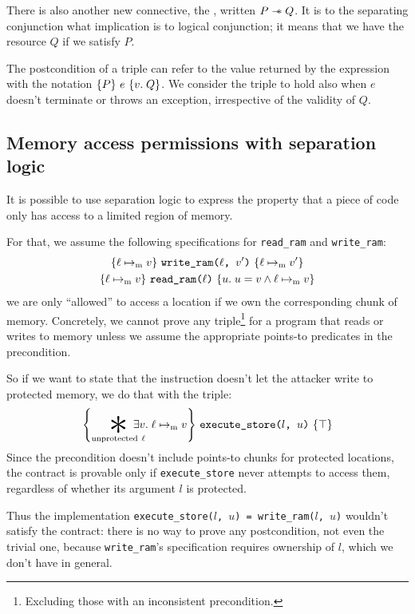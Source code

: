 There is also another new connective, the , written \(P \mathrel{-\!\!\ast} Q\). It is to the separating conjunction what implication is to logical conjunction; it means that we have the resource \(Q\) if we satisfy \(P\).

The postcondition of a triple can refer to the value returned by the expression with the notation \(\hoare{P}{e}[v]{Q}\). We consider the triple to hold also when \(e\) doesn't terminate or throws an exception, irrespective of the validity of \(Q\).

\subsection{Memory access permissions with separation logic}
\label{sec:sep-logic-permissions}

It is possible to use separation logic to express the property that a piece of code only has access to a limited region of memory.

For that, we assume the following specifications for \texttt{read\_ram} and \texttt{write\_ram}:
\begin{gather*}
  \hoare{\ell \ptom v}{\texttt{write\_ram($\ell$, $v'$)}}{\ell \ptom v'} \\
  \hoare{\ell \ptom v}{\texttt{read\_ram($\ell$)}}[u]{u = v \wedge \ell \ptom v}
\end{gather*}
we are only ``allowed'' to access a location if we own the corresponding chunk of memory. Concretely, we cannot prove any triple\footnote{Excluding those with an inconsistent precondition.} for a program that reads or writes to memory unless we assume the appropriate points-to predicates in the precondition.

So if we want to state that the  instruction doesn't let the attacker write to protected memory, we do that with the triple:
\[ \hoare{\bigast_{\smash{\mathrm{unprotected}~\ell}}\hspace{-1.25em} \exists v.\; \ell \ptom v}{\texttt{execute\_store($l$, $u$)}}{\top}\]
Since the precondition doesn't include points-to chunks for protected locations, the contract is provable only if \texttt{execute\_store} never attempts to access them, regardless of whether its argument \(l\) is protected.

Thus the implementation \texttt{execute\_store(\(l\), \(u\)) = write\_ram(\(l\), \(u\))} wouldn't satisfy the contract: there is no way to prove any postcondition, not even the trivial one, because \texttt{write\_ram}'s specification requires ownership of \(l\), which we don't have in general.

